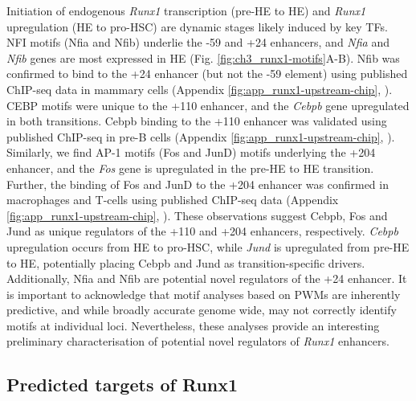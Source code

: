 Initiation of endogenous \textit{Runx1} transcription (pre-HE to HE) and \textit{Runx1} upregulation (HE to pro-HSC) are dynamic stages likely induced by key TFs. NFI motifs (Nfia and Nfib) underlie the -59 and +24 enhancers, and \textit{Nfia} and \textit{Nfib} genes are most expressed in HE (Fig. \ref{fig:ch3_runx1-motifs}A-B). Nfib was confirmed to bind to the +24 enhancer (but not the -59 element) using published ChIP-seq data in mammary cells (Appendix \ref{fig:app_runx1-upstream-chip}, \cite{shin_hierarchy_2016}). CEBP motifs were unique to the +110 enhancer, and the \textit{Cebpb} gene upregulated in both transitions. Cebpb binding to the +110 enhancer was validated using published ChIP-seq in pre-B cells (Appendix \ref{fig:app_runx1-upstream-chip}, \cite{van_oevelen_cebp_2015}). Similarly, we find AP-1 motifs (Fos and JunD) motifs underlying the +204 enhancer, and the \textit{Fos} gene is upregulated in the pre-HE to HE transition. Further, the binding of Fos and JunD to the +204 enhancer was confirmed in macrophages and T-cells using published ChIP-seq data (Appendix \ref{fig:app_runx1-upstream-chip}, \cite{roychoudhuri_bach2_2016, eichenfield_tissue_2016}). These observations suggest Cebpb, Fos and Jund as unique regulators of the +110 and +204 enhancers, respectively. \textit{Cebpb} upregulation occurs from HE to pro-HSC, while \textit{Jund} is upregulated from pre-HE to HE, potentially placing Cebpb and Jund as transition-specific drivers. Additionally, Nfia and Nfib are potential novel regulators of the +24 enhancer. It is important to acknowledge that motif analyses based on PWMs are inherently predictive, and while broadly accurate genome wide, may not correctly identify motifs at individual loci. Nevertheless, these analyses provide an interesting preliminary characterisation of potential novel regulators of \textit{Runx1} enhancers.


\subsection{\label{ch3:runx1-targets}Predicted targets of Runx1}


